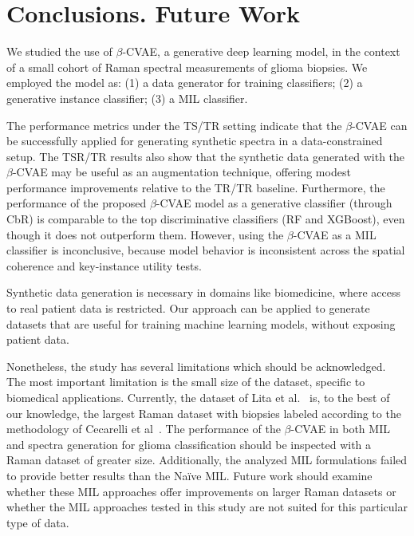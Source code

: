 \documentclass[12pt]{article}
\theoremstyle{paper}
\begin{document}
\section{Conclusions. Future Work}
We studied the use of $\beta$-CVAE, a generative deep learning model, in the context of a small cohort of Raman spectral measurements of glioma biopsies. We employed the model as:  
(1) a data generator for training classifiers;
(2) a generative instance classifier;
(3) a MIL classifier.

The performance metrics under the TS/TR setting indicate that the $\beta$-CVAE can be successfully applied for generating synthetic spectra in a data-constrained setup. The TSR/TR results also show that the synthetic data generated with the $\beta$-CVAE may be useful as an augmentation technique, offering modest performance improvements relative to the TR/TR baseline. Furthermore, the performance of the proposed $\beta$-CVAE model as a generative classifier (through CbR) is comparable to the top discriminative classifiers (RF and XGBoost), even though it does not outperform them. However, using the $\beta$-CVAE as a MIL classifier is inconclusive, because model behavior is inconsistent across the spatial coherence and key-instance utility tests.


Synthetic data generation is necessary in domains like biomedicine, where access to real patient data is restricted. Our approach can be applied to generate datasets that are useful for training machine learning models, without exposing patient data. 

Nonetheless, the study has several limitations which should be acknowledged. The most important limitation is the small size of the dataset, specific to biomedical applications. Currently, the dataset of Lita et al.~\cite{apollonov2024raman} is, to the best of our knowledge, the largest Raman dataset with biopsies labeled according to the methodology of Cecarelli et al~\cite{Ceccarelli2016}. The performance of the $\beta$-CVAE in both MIL and spectra generation for glioma classification should be inspected with a Raman dataset of greater size. Additionally, the analyzed MIL formulations failed to provide better results than the Naïve MIL. Future work should examine whether these MIL approaches offer improvements on larger Raman datasets or whether the MIL approaches tested in this study are not suited for this particular type of data. 
\end{document}
